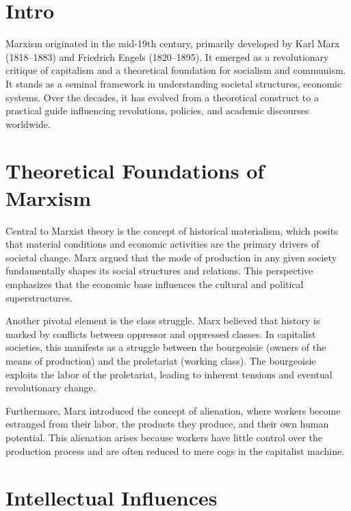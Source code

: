\documentclass[14pt, russian]{matmex-diploma-custom}
\begin{document}

\maketitle

\section{Intro}
Marxism originated in the mid-19th century, primarily developed by Karl Marx (1818–1883) and Friedrich Engels (1820–1895).
It emerged as a revolutionary critique of capitalism and a theoretical foundation for socialism and communism.
It stands as a seminal framework in understanding societal structures, economic systems.
Over the decades, it has evolved from a theoretical construct to a practical guide influencing revolutions, policies, and academic discourses worldwide.

\section{Theoretical Foundations of Marxism}
Central to Marxist theory is the concept of historical materialism, which posits that material conditions and economic activities are the primary drivers of societal change.
Marx argued that the mode of production in any given society fundamentally shapes its social structures and relations. This perspective emphasizes that the economic base influences the cultural and political superstructures.

Another pivotal element is the class struggle. Marx believed that history is marked by conflicts between oppressor and oppressed classes.
In capitalist societies, this manifests as a struggle between the bourgeoisie (owners of the means of production) and the proletariat (working class).
The bourgeoisie exploits the labor of the proletariat, leading to inherent tensions and eventual revolutionary change.

Furthermore, Marx introduced the concept of alienation, where workers become estranged from their labor, the products they produce, and their own human potential.
This alienation arises because workers have little control over the production process and are often reduced to mere cogs in the capitalist machine.

\section{Intellectual Influences}
\end{document}

